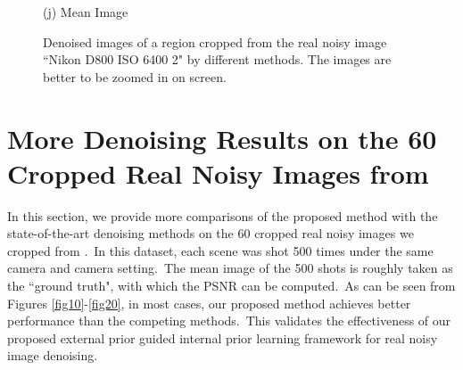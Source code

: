 \documentclass[10pt,onecolumn,letterpaper]{article}
\begin{document}
\begin{figure}[H]
{\begin{minipage}[t]{0.195\textwidth}
{\footnotesize (j) Mean Image \cite{crosschannel2016}}
\end{minipage}
}
\caption{Denoised images of a region cropped from the real noisy image ``Nikon D800 ISO 6400 2" \cite{crosschannel2016} by different methods. The images are better to be zoomed in on screen.}
\label{fig9}
\end{figure}

\section{More Denoising Results on the 60 Cropped Real Noisy Images from \cite{crosschannel2016}}
In this section, we provide more comparisons of the proposed method with the state-of-the-art denoising methods on the 60 cropped real noisy images we cropped from \cite{crosschannel2016}.\ In this dataset, each scene was shot 500 times under the same camera and camera setting.\ The mean image of the 500 shots is roughly taken as the ``ground truth", with which the PSNR can be computed.\ As can be seen from Figures \ref{fig10}-\ref{fig20}, in most cases, our proposed method achieves better performance than the competing methods.\ This validates the effectiveness of our proposed external prior guided internal prior learning framework for real noisy image denoising.
\end{document}
